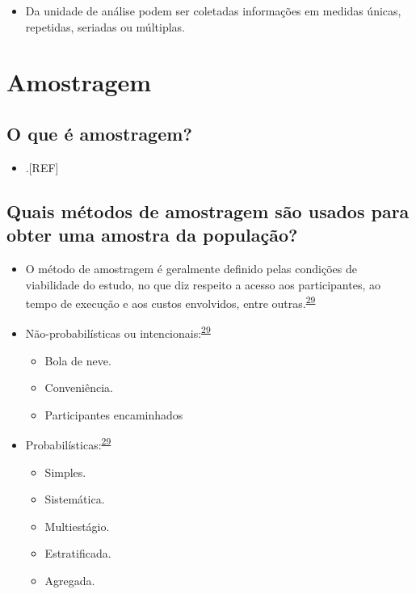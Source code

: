 \documentclass[
  a4paper,
]{book}
\providecommand{\tightlist}{%
  \setlength{\itemsep}{0pt}\setlength{\parskip}{0pt}}
\begin{document}
\begin{itemize}
\tightlist
\item
  Da unidade de análise podem ser coletadas informações em medidas únicas, repetidas, seriadas ou múltiplas.
\end{itemize}

\hypertarget{amostragem}{%
\section{Amostragem}\label{amostragem}}

\hypertarget{o-que-uxe9-amostragem}{%
\subsection{O que é amostragem?}\label{o-que-uxe9-amostragem}}

\begin{itemize}
\tightlist
\item
  .{[}REF{]}
\end{itemize}

\hypertarget{quais-muxe9todos-de-amostragem-suxe3o-usados-para-obter-uma-amostra-da-populauxe7uxe3o}{%
\subsection{Quais métodos de amostragem são usados para obter uma amostra da população?}\label{quais-muxe9todos-de-amostragem-suxe3o-usados-para-obter-uma-amostra-da-populauxe7uxe3o}}

\begin{itemize}
\item
  O método de amostragem é geralmente definido pelas condições de viabilidade do estudo, no que diz respeito a acesso aos participantes, ao tempo de execução e aos custos envolvidos, entre outras.\textsuperscript{\protect\hyperlink{ref-Banerjee2010}{29}}
\item
  Não-probabilísticas ou intencionais:\textsuperscript{\protect\hyperlink{ref-Banerjee2010}{29}}

  \begin{itemize}
  \item
    Bola de neve.
  \item
    Conveniência.
  \item
    Participantes encaminhados
  \end{itemize}
\item
  Probabilísticas:\textsuperscript{\protect\hyperlink{ref-Banerjee2010}{29}}

  \begin{itemize}
  \item
    Simples.
  \item
    Sistemática.
  \item
    Multiestágio.
  \item
    Estratificada.
  \item
    Agregada.
  \end{itemize}
\end{itemize}
\end{document}
